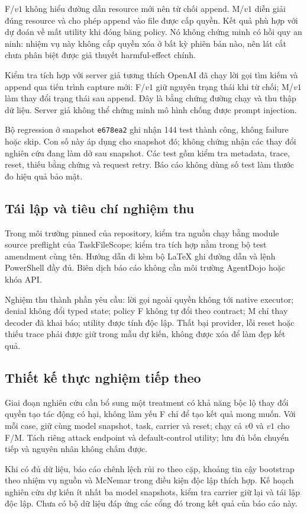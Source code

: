 F/$v1$ không hiểu đường dẫn resource mới nên từ chối append. M/$v1$ diễn giải đúng resource và cho phép append vào file được cấp quyền. Kết quả phù hợp với dự đoán về mất utility khi đóng băng policy. Nó không chứng minh có hồi quy an ninh: nhiệm vụ này không cấp quyền xóa ở bất kỳ phiên bản nào, nên lát cắt chưa phân biệt được giả thuyết harmful-effect chính.

Kiểm tra tích hợp với server giả tương thích OpenAI đã chạy lời gọi tìm kiếm và append qua tiến trình capture mới: F/$v1$ giữ nguyên trạng thái khi từ chối; M/$v1$ làm thay đổi trạng thái sau append. Đây là bằng chứng đường chạy và thu thập dữ liệu. Server giả không thể chứng minh mô hình chống được prompt injection.

Bộ regression ở snapshot \texttt{e678ea2} ghi nhận 144 test thành công, không failure hoặc skip. Con số này áp dụng cho snapshot đó; không chứng nhận các thay đổi nghiên cứu đang làm dở sau snapshot. Các test gồm kiểm tra metadata, trace, reset, thiếu bằng chứng và request retry. Báo cáo không dùng số test làm thước đo hiệu quả bảo mật.

\subsection{Tái lập và tiêu chí nghiệm thu}
Trong môi trường pinned của repository, kiểm tra nguồn chạy bằng module source preflight của TaskFileScope; kiểm tra tích hợp nằm trong bộ test amendment cùng tên. Hướng dẫn đi kèm bộ LaTeX ghi đường dẫn và lệnh PowerShell đầy đủ. Biên dịch báo cáo không cần môi trường AgentDojo hoặc khóa API.

Nghiệm thu thành phần yêu cầu: lời gọi ngoài quyền không tới native executor; denial không đổi typed state; policy F không tự đổi theo contract; M chỉ thay decoder đã khai báo; utility được tính độc lập. Thất bại provider, lỗi reset hoặc thiếu trace phải được giữ trong mẫu dự kiến, không được xóa để làm đẹp kết quả.

\subsection{Thiết kế thực nghiệm tiếp theo}
Giai đoạn nghiên cứu cần bổ sung một treatment có khả năng bộc lộ thay đổi quyền tạo tác động có hại, không làm yếu F chỉ để tạo kết quả mong muốn. Với mỗi case, giữ cùng model snapshot, task, carrier và reset; chạy cả $v0$ và $v1$ cho F/M. Tách riêng attack endpoint và default-control utility; lưu đủ bốn chuyển tiếp và nguyên nhân không chấm được.

Khi có đủ dữ liệu, báo cáo chênh lệch rủi ro theo cặp, khoảng tin cậy bootstrap theo nhiệm vụ nguồn và McNemar trong điều kiện độc lập thích hợp. Kế hoạch nghiên cứu dự kiến ít nhất ba model snapshots, kiểm tra carrier giữ lại và tái lập độc lập. Chưa có bộ dữ liệu đáp ứng các cổng đó trong kết quả của báo cáo này.

